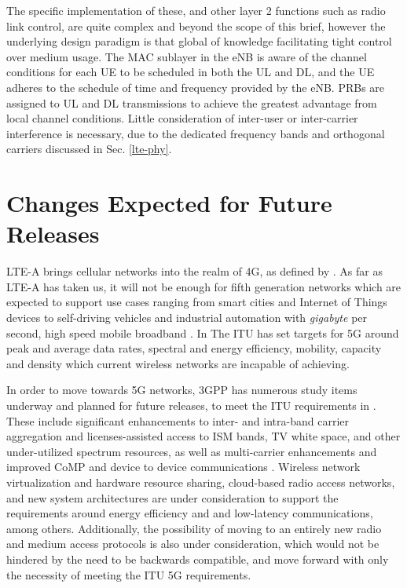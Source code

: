 The specific implementation of these, and other layer 2 functions such as radio link control, are quite complex and beyond the scope of this brief, however the underlying design paradigm is that global of knowledge facilitating tight control over medium usage. The MAC sublayer in the eNB is aware of the channel conditions for each UE to be scheduled in both the UL and DL, and the UE adheres to the schedule of time and frequency provided by the eNB.  PRBs are assigned to UL and DL transmissions to achieve the greatest advantage from local channel conditions. Little consideration of inter-user or inter-carrier interference is necessary, due to the dedicated frequency bands and orthogonal carriers discussed in Sec. \ref{lte-phy}.  

\section {Changes Expected for Future Releases}
\label{fut-chnge}
LTE-A brings cellular networks into the realm of 4G, as defined by \cite{itu-advanced}.  As far as LTE-A has taken us, it will not be enough for fifth generation networks which are expected to support use cases ranging from smart cities and Internet of Things devices to  self-driving vehicles and industrial automation with \emph{gigabyte} per second, high speed mobile broadband \cite{itu-2020}.  In The ITU has set targets for 5G around peak and average data rates, spectral and energy efficiency, mobility, capacity and density which current wireless networks are incapable of achieving.  

In order to move towards 5G networks, 3GPP has numerous study items underway and planned for future releases, to meet the ITU requirements in \cite{itu-2020}.  These include significant enhancements to inter- and intra-band carrier aggregation and licenses-assisted access to ISM bands, TV white space, and other under-utilized spectrum resources, as well as multi-carrier enhancements and improved CoMP and device to device communications \cite{lteA-gantt}.  Wireless network virtualization and hardware resource sharing, cloud-based radio access networks, and new system architectures are under consideration to support the requirements around energy efficiency and and low-latency communications, among others.  Additionally, the possibility of moving to an entirely new radio and medium access protocols is also under consideration, which would not be hindered by the need to be backwards compatible, and move forward with only the necessity of meeting the ITU 5G requirements.  



